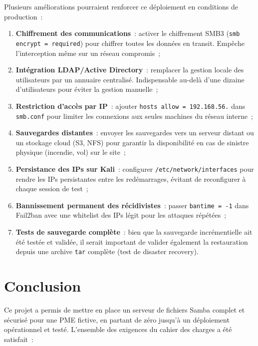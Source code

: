 \documentclass[12pt,a4paper]{article}
\begin{document}
Plusieurs améliorations pourraient renforcer ce déploiement en conditions de production~:

\begin{enumerate}[leftmargin=2em]
  \item \textbf{Chiffrement des communications}~: activer le chiffrement SMB3
    (\texttt{smb encrypt = required}) pour chiffrer toutes les données en transit.
    Empêche l'interception même sur un réseau compromis~;

  \item \textbf{Intégration LDAP/Active Directory}~: remplacer la gestion locale des
    utilisateurs par un annuaire centralisé. Indispensable au-delà d'une dizaine
    d'utilisateurs pour éviter la gestion manuelle~;

  \item \textbf{Restriction d'accès par IP}~: ajouter \texttt{hosts allow = 192.168.56.}
    dans \texttt{smb.conf} pour limiter les connexions aux seules machines du réseau interne~;

  \item \textbf{Sauvegardes distantes}~: envoyer les sauvegardes vers un serveur distant
    ou un stockage cloud (S3, NFS) pour garantir la disponibilité en cas de sinistre
    physique (incendie, vol) sur le site~;

  \item \textbf{Persistance des IPs sur Kali}~: configurer \texttt{/etc/network/interfaces}
    pour rendre les IPs persistantes entre les redémarrages, évitant de reconfigurer
    à chaque session de test~;

  \item \textbf{Bannissement permanent des récidivistes}~: passer \texttt{bantime = -1}
    dans Fail2ban avec une whitelist des IPs légit pour les attaques répétées~;

  \item \textbf{Tests de sauvegarde complète}~: bien que la sauvegarde incrémentielle ait
    été testée et validée, il serait important de valider également la restauration depuis
    une archive \texttt{tar} complète (test de disaster recovery).
\end{enumerate}

\section{Conclusion}

Ce projet a permis de mettre en place un serveur de fichiers Samba complet et sécurisé
pour une PME fictive, en partant de zéro jusqu'à un déploiement opérationnel et testé.
L'ensemble des exigences du cahier des charges a été satisfait~:
\end{document}
